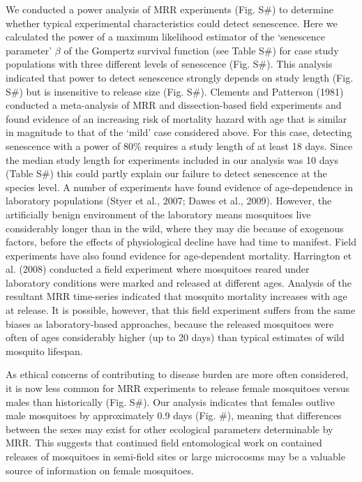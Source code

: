 \documentclass[]{article}
\begin{document}
We conducted a power analysis of MRR experiments (Fig. S\#) to determine
whether typical experimental characteristics could detect senescence.
Here we calculated the power of a maximum likelihood estimator of the
`senescence parameter' $\beta$ of the Gompertz survival function (see Table
S\#) for case study populations with three different levels of
senescence (Fig. S\#). This analysis indicated that power to detect
senescence strongly depends on study length (Fig. S\#) but is
insensitive to release size (Fig. S\#). Clements and Patterson (1981)
conducted a meta-analysis of MRR and dissection-based field experiments
and found evidence of an increasing risk of mortality hazard with age
that is similar in magnitude to that of the `mild' case considered
above. For this case, detecting senescence with a power of 80\% requires
a study length of at least 18 days. Since the median study length for
experiments included in our analysis was 10 days (Table S\#) this could
partly explain our failure to detect senescence at the species level. A
number of experiments have found evidence of age-dependence in
laboratory populations (Styer et al., 2007; Dawes et al., 2009).
However, the artificially benign environment of the laboratory means
mosquitoes live considerably longer than in the wild, where they may die
because of exogenous factors, before the effects of physiological
decline have had time to manifest. Field experiments have also found
evidence for age-dependent mortality. Harrington et al. (2008) conducted
a field experiment where mosquitoes reared under laboratory conditions
were marked and released at different ages. Analysis of the resultant
MRR time-series indicated that mosquito mortality increases with age at
release. It is possible, however, that this field experiment suffers
from the same biases as laboratory-based approaches, because the
released mosquitoes were often of ages considerably higher (up to 20
days) than typical estimates of wild mosquito lifespan.

As ethical concerns of contributing to disease burden are more often
considered, it is now less common for MRR experiments to release female
mosquitoes versus males than historically (Fig. S\#). Our analysis
indicates that females outlive male mosquitoes by approximately 0.9 days
(Fig. \#), meaning that differences between the sexes may exist for
other ecological parameters determinable by MRR. This suggests that
continued field entomological work on contained releases of mosquitoes
in semi-field sites or large microcosms may be a valuable source of
information on female mosquitoes.
\end{document}
